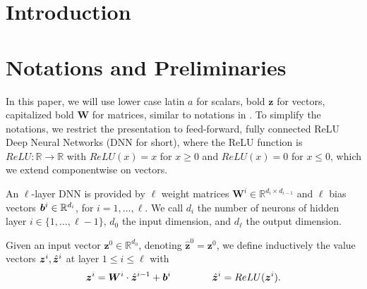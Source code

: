 \documentclass{llncs}
\begin{document}
\begin{abstract}
		
	\end{abstract}
	

\section{Introduction}


%


\section{Notations and Preliminaries}

In this paper, we will use lower case latin $a$ for scalars, bold $\boldsymbol{z}$ for vectors, 
capitalized bold $\boldsymbol{W}$ for matrices, similar to notations in \cite{crown}.
To simplify the notations, we restrict the presentation to feed-forward, 
fully connected ReLU Deep Neural Networks (DNN for short), where the ReLU function is $ReLU : \mathbb{R} \rightarrow \mathbb{R}$ with
$ReLU(x)=x$ for $x \geq 0$ and $ReLU(x)=0$ for $x \leq 0$, which we extend componentwise on vectors.




An $\ell$-layer DNN is provided by $\ell$ weight matrices 
$\boldsymbol{W}^i \in \mathbb{R}^{d_i\times d_{i-1}}$
and $\ell$ bias vectors ${\bm{b}}^i \in \mathbb{R}^{d_i}$, for $i=1, \ldots, \ell$.
We call $d_i$ the number of neurons of hidden layer $i \in \{1, \ldots, \ell-1\}$,
$d_0$ the input dimension, and $d_\ell$ the output dimension.

Given an input vector $\boldsymbol{z}^0 \in \mathbb{R}^{d_0}$, 
denoting $\hat{\boldsymbol{z}}^{0}={\boldsymbol{z}}^0$, we define inductively the value vectors $\boldsymbol{z}^i,\hat{{\bm{z}}}^i$ at layer $1 \leq i \leq \ell$ with
\begin{align*}
	\boldsymbol{z}^{i} = \boldsymbol{W}^i\cdot \hat{\boldsymbol{z}}^{i-1}+ {\bm{b}}^i \qquad \, \qquad
	\hat{\boldsymbol{z}}^{i} = ReLU({\boldsymbol{z}}^i).
\end{align*} 
\end{document}
